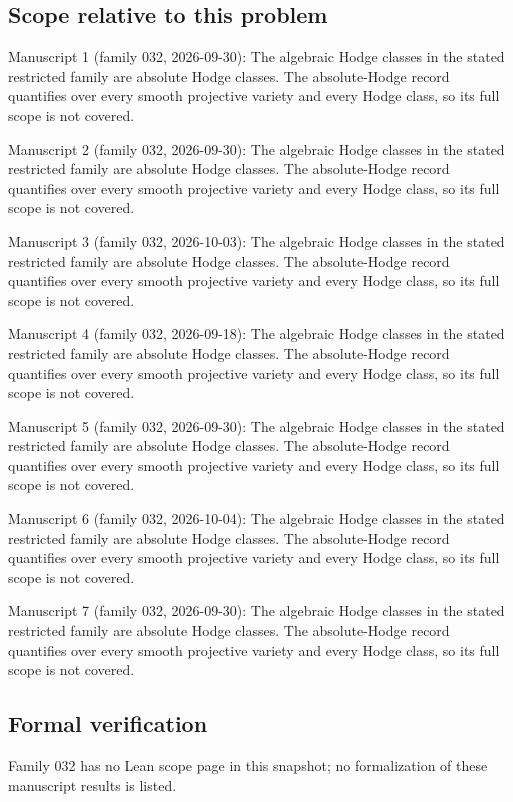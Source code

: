 \documentclass[11pt]{article}
\begin{document}
\subsection{Scope relative to this problem}
Manuscript 1 (family 032, 2026-09-30): The algebraic Hodge classes in the stated restricted family are absolute Hodge classes. The absolute-Hodge record quantifies over every smooth projective variety and every Hodge class, so its full scope is not covered.

Manuscript 2 (family 032, 2026-09-30): The algebraic Hodge classes in the stated restricted family are absolute Hodge classes. The absolute-Hodge record quantifies over every smooth projective variety and every Hodge class, so its full scope is not covered.

Manuscript 3 (family 032, 2026-10-03): The algebraic Hodge classes in the stated restricted family are absolute Hodge classes. The absolute-Hodge record quantifies over every smooth projective variety and every Hodge class, so its full scope is not covered.

Manuscript 4 (family 032, 2026-09-18): The algebraic Hodge classes in the stated restricted family are absolute Hodge classes. The absolute-Hodge record quantifies over every smooth projective variety and every Hodge class, so its full scope is not covered.

Manuscript 5 (family 032, 2026-09-30): The algebraic Hodge classes in the stated restricted family are absolute Hodge classes. The absolute-Hodge record quantifies over every smooth projective variety and every Hodge class, so its full scope is not covered.

Manuscript 6 (family 032, 2026-10-04): The algebraic Hodge classes in the stated restricted family are absolute Hodge classes. The absolute-Hodge record quantifies over every smooth projective variety and every Hodge class, so its full scope is not covered.

Manuscript 7 (family 032, 2026-09-30): The algebraic Hodge classes in the stated restricted family are absolute Hodge classes. The absolute-Hodge record quantifies over every smooth projective variety and every Hodge class, so its full scope is not covered.

\subsection{Formal verification}
Family 032 has no Lean scope page in this snapshot; no formalization of these manuscript results is listed.
\end{document}
